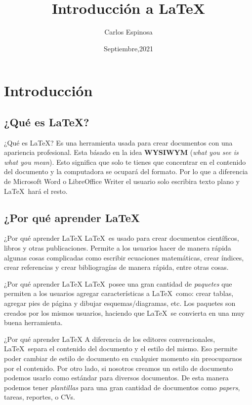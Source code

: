 \documentclass{beamer}
\title{Introducci\'on a \LaTeX}
\author{Carlos Espinosa}
\date{Septiembre,2021}
\begin{document}
\begin{frame}
  \titlepage
\end{frame}

\section{Introducci\'on}
	\subsection{¿Qu\'e es \LaTeX?}
		\begin{frame}{¿Qu\'e es \LaTeX?}
			\justifying
				Es una herramienta usada para crear documentos con una apariencia profesional. Esta b\'asado en la idea \textbf{WYSIWYM} (\textit{what you see is what you mean}). Esto significa que solo te tienes que concentrar en el contenido del documento y la computadora se ocupar\'a del formato. Por lo que a diferencia de Microsoft Word o LibreOffice Writer el usuario solo escribira texto plano y \LaTeX\ har\'a el resto.
		\end{frame}

	\subsection{¿Por qu\'e aprender \LaTeX}
		\begin{frame}{¿Por qu\'e aprender \LaTeX}
			\justifying
				\LaTeX\ es usado para crear documentos cient\'ificos, libros y otras publicaciones. Permite a los usuarios hacer de manera r\'apida algunas cosas complicadas como escribir ecuaciones matem\'aticas, crear \'indices, crear referencias y crear bibliograg\'ias de manera rápida, entre otras cosas. \par
		\end{frame}
		\begin{frame}{¿Por qu\'e aprender \LaTeX}
			\justifying
				\LaTeX\ posee una gran cantidad de \textit{paquetes} que permiten a los usuarios agregar caracter\'isticas a \LaTeX\ como: crear tablas, agregar pies de p\'agina y dibujar esquemas/diagramas, etc. Los paquetes son creados por los mismos usuarios, haciendo que \LaTeX\ se convierta en una muy buena herramienta. \par
		\end{frame}
		\begin{frame}{¿Por qu\'e aprender \LaTeX}
			\justifying
				A diferencia de los editores convencionales, \LaTeX\ separa el contenido del documento y el estilo del mismo. Eso permite poder cambiar de estilo de documento en cualquier momento sin preocuparnos por el contenido. Por otro lado, si nosotros creamos un estilo de documento podemos usarlo como estándar para diversos documentos. De esta manera podemos tener \textit{plantillas} para una gran cantidad de documentos como \textit{papers}, tareas, reportes, o CVs.
		\end{frame}
\end{document}
